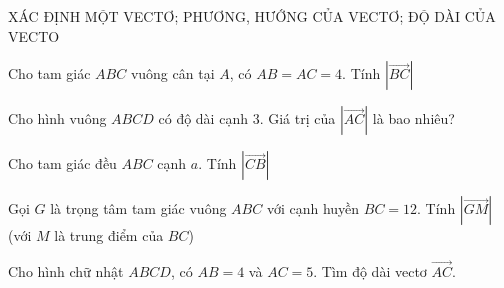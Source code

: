 \begin{dang}{XÁC ĐỊNH MỘT VECTƠ; PHƯƠNG, HƯỚNG CỦA VECTƠ; ĐỘ DÀI CỦA VECTO}
    \begin{vd}
        Cho tam giác $ABC$ vuông cân tại $A$, có $AB = AC = 4$. Tính $\left|\vec{BC}\right|$
    \end{vd}

    \begin{vd}
        Cho hình vuông $ABCD$ có độ dài cạnh $3$. Giá trị của $\left|\vec{AC}\right|$ là bao nhiêu?
    \end{vd}

    \begin{vd}
        Cho tam giác đều $ABC$ cạnh $a$. Tính $\left|\vec{CB}\right|$
    \end{vd}

    \begin{vd}
        Gọi $G$ là trọng tâm tam giác vuông $ABC$ với cạnh huyền $BC = 12$. Tính $\left|\vec{GM}\right|$ (với $M$ là trung điểm của $BC$)
    \end{vd}

    \begin{vd}
        Cho hình chữ nhật $ABCD$, có $AB = 4$ và $AC = 5$. Tìm độ dài vectơ $\vec{AC}$.
    \end{vd}
\end{dang}

